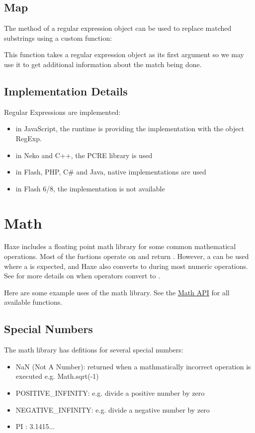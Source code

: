 \documentclass{haxe}
\begin{document}

\subsection{Map}
\label{std-regex-map}

The  method of a regular expression object can be used to replace matched substrings using a custom function:


This function takes a regular expression object as its first argument so we may use it to get additional information about the match being done.

\subsection{Implementation Details}
\label{std-regex-implementation-details}

Regular Expressions are implemented:
\begin{itemize}
    \item in JavaScript, the runtime is providing the implementation with the object RegExp.
    \item in Neko and C++, the PCRE library is used
    \item in Flash, PHP, C\# and Java, native implementations are used
    \item in Flash 6/8, the implementation is not available
\end{itemize}


\section{Math}
\label{std-math}

Haxe includes a floating point math library for some common mathematical operations.  Most of the fuctions operate on and return .  However, a  can be used where a  is expected, and Haxe also converts  to  during most numeric operations.  See  for more details on when operators convert  to .

Here are some example uses of the math library.  See the \href{http://api.haxe.org/Math.html}{Math API} for all available functions.


\subsection{Special Numbers}
\label{std-math-special-numbers}
The math library has defitions for several special numbers:
\begin{itemize}
	\item NaN (Not A Number): returned when a mathmatically incorrect operation is executed e.g. Math.sqrt(-1)
	\item POSITIVE_INFINITY: e.g. divide a positive number by zero
	\item NEGATIVE_INFINITY: e.g. divide a negative number by zero
	\item PI : 3.1415...
\end{itemize}
\end{document}
